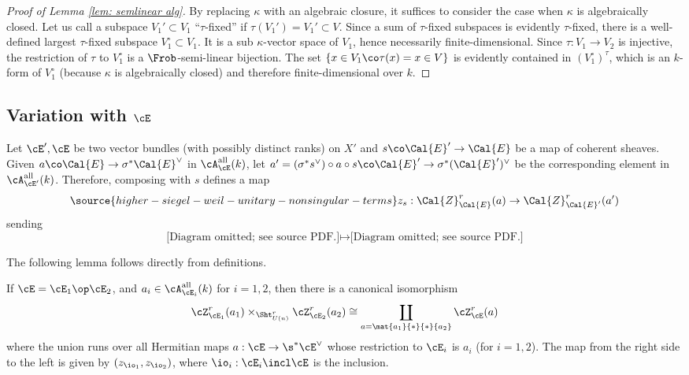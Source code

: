 \begin{proof}[Proof of Lemma \ref{lem: semlinear alg}] By replacing $\kappa$ with an algebraic closure, it suffices to consider the case when $\kappa$ is algebraically closed. Let us call a subspace $V_1' \subset V_1$ ``$\tau$-fixed'' if $\tau(V_1') = V_1' \subset V$. Since a sum of $\tau$-fixed subspaces is evidently $\tau$-fixed, there is a well-defined largest $\tau$-fixed subspace $V^{\circ}_1 \subset V_1$. It is a sub $\kappa$-vector space of $V_1$, hence necessarily finite-dimensional. Since $\tau:V_1\to V_2$ is injective, the restriction of  $\tau$ to $V_1^{\circ}$ is a $\Frob$-semi-linear bijection. The set $\{ x \in V_1 \co \tau(x) = x  \in V\}$ is evidently contained in $(V_1^{\circ})^{\tau}$, which is an $k$-form of $V_1^{\circ}$ (because $\kappa$ is algebraically closed) and therefore finite-dimensional over $k$.
\end{proof}

\subsection{Variation with $\cE$}
Let $\cE',\cE$ be two vector bundles (with possibly distinct ranks) on $X'$ and $s \co \Cal{E}' \to \Cal{E}$ be a map of coherent sheaves. Given $a \co \Cal{E} \to \sigma^* \Cal{E}^{\vee}$ in $\cA^{\rm all}_{\cE}(k)$, let $a'  = (\sigma^{*} s^{\vee} ) \circ a \circ s \co \Cal{E}' \to \sigma^* (\Cal{E}')^{\vee}$ be the corresponding element in $\cA^{\rm all}_{\cE'}(k)$. Therefore, composing with $s$ defines a map
\begin{equation}\label{eq: Z_E to Z_E'}
\source{higher-siegel-weil-unitary-nonsingular-terms}
z_{s}: \Cal{Z}_{\Cal{E}}^r(a) \to \Cal{Z}_{\Cal{E}'}^r(a')
\end{equation}
sending
\[
\text{[Diagram omitted; see source PDF.]} \mapsto
\text{[Diagram omitted; see source PDF.]}
\]

The following lemma follows directly from definitions.

\begin{lemma}
\notready\label{l:KR direct sum}
If $\cE=\cE_{1}\op \cE_{2}$, and $a_{i}\in \cA^{\rm all}_{\cE_{i}}(k)$ for $i=1,2$, then there is a canonical isomorphism
\begin{equation}
\cZ^{r}_{\cE_{1}}(a_{1})\times_{\Sht^{r}_{U(n)}}\cZ^{r}_{\cE_{2}}(a_{2})\cong \coprod_{a=\mat{a_{1}}{*}{*}{a_{2}}}\cZ^{r}_{\cE}(a)
\end{equation}
where the union runs over all  Hermitian maps $a:\cE\to \s^{*}\cE^{\vee}$ whose restriction to $\cE_{i}$ is $a_{i}$ (for $i=1,2$). The map from the right side to the left is given by $(z_{\io_{1}},z_{\io_{2}})$, where $\io_{i}:\cE_{i}\incl \cE$ is the inclusion.
\end{lemma}


